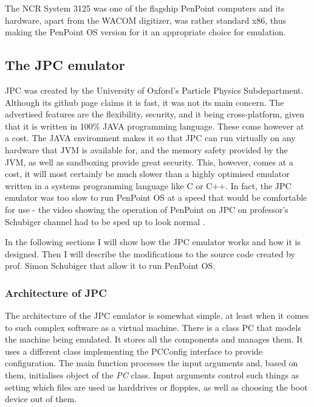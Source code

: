 The NCR System 3125 was one of the flagship PenPoint computers and its
hardware, apart from the WACOM digitizer, was rather standard x86, thus making
the PenPoint OS version for it an appropriate choice for emulation.

\subsection{The JPC emulator}

JPC was created by the University of Oxford's Particle Physics Subdepartment.
Although its github page claims it is fast, it was not its main concern. The
advertised features are the flexibility, security, and it being cross-platform,
given that it is written in 100\% JAVA programming language. These come however
at a cost. The JAVA environment makes it so that JPC can run virtually on any
hardware that JVM is available for, and the memory safety provided by the JVM,
as well as sandboxing provide great security. This, however, comes at a cost, it
will most certainly be much slower than a highly optimised emulator written in
a systems programming language like C or C++. In fact, the JPC emulator was too
slow to run PenPoint OS at a speed that would be comfortable for use - the
video showing the operation of PenPoint on JPC on professor's Schubiger channel
had to be sped up to look normal \cite{schubiger2015}.

In the following sections I will show how the JPC emulator works and how it is
designed. Then I will describe the modifications to the source code created by
prof. Simon Schubiger that allow it to run PenPoint OS.

\subsubsection{Architecture of JPC}

The architecture of the JPC emulator is somewhat simple, at least when it comes
to such complex software as a virtual machine. There is a class PC that models
the machine being emulated. It stores all the components and manages them. It
uses a different class implementing the PCConfig interface to provide
configuration. The main function processes the input arguments and, based on
them, initialises object of the \emph{PC} class. Input arguments control such things
as setting which files are used as harddrives or floppies, as well as choosing
the boot device out of them.

\begin{codeblock}
    
\end{codeblock}

